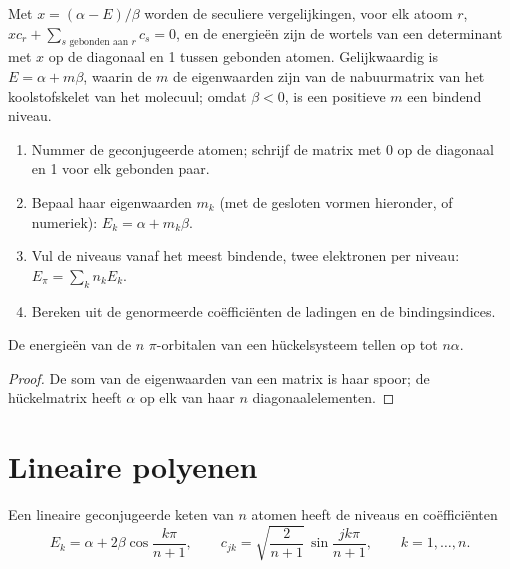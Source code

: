 Met $x = (\alpha - E)/\beta$ worden de seculiere vergelijkingen, voor elk atoom $r$,
$xc_r + \sum_{s \text{ gebonden aan } r} c_s = 0$, en de energieën zijn de wortels van een
determinant met $x$ op de diagonaal en 1 tussen gebonden atomen. Gelijkwaardig is $E =
\alpha + m\beta$, waarin de $m$ de eigenwaarden zijn van de nabuurmatrix van het
koolstofskelet van het molecuul; omdat $\beta < 0$, is een positieve $m$ een bindend niveau.

\begin{method}\label{met:b2:huckel:huckel}
\begin{enumerate}
  \item Nummer de geconjugeerde atomen; schrijf de matrix met 0 op de diagonaal en 1
        voor elk gebonden paar.
  \item Bepaal haar eigenwaarden $m_k$ (met de gesloten vormen hieronder, of numeriek): $E_k =
        \alpha + m_k\beta$.
  \item Vul de niveaus vanaf het meest bindende, twee elektronen per niveau:
        $E_\pi = \sum_k n_k E_k$.
  \item Bereken uit de genormeerde coëfficiënten de ladingen en de bindingsindices.
\end{enumerate}
\end{method}

\begin{proposition}[Spoor]\label{prop:b2:huckel:trace}
De energieën van de $n$ $\pi$-orbitalen van een hückelsysteem tellen op tot $n\alpha$.
\end{proposition}

\begin{proof}
De som van de eigenwaarden van een matrix is haar spoor; de hückelmatrix heeft $\alpha$
op elk van haar $n$ diagonaalelementen.
\end{proof}

\section{Lineaire polyenen}

\begin{theorem}\label{thm:b2:huckel:polyene}
Een lineaire geconjugeerde keten van $n$ atomen heeft de niveaus en coëfficiënten
\[
  E_k = \alpha + 2\beta\cos\frac{k\pi}{n + 1}, \qquad
  c_{jk} = \sqrt{\frac{2}{n + 1}}\,\sin\frac{jk\pi}{n + 1}, \qquad k = 1, \dots, n .
\]
\end{theorem}

